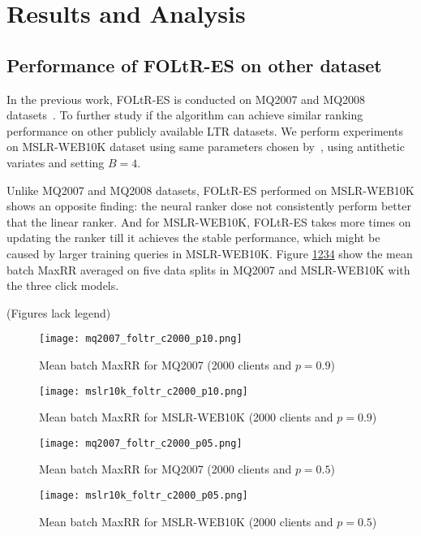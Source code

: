 \section{Results and Analysis}



\subsection{Performance of FOLtR-ES on other dataset}

In the previous work, FOLtR-ES is conducted on MQ2007 and MQ2008 datasets~\cite{kharitonov2019federated}. To further study if the algorithm can achieve similar ranking performance on other publicly available LTR datasets. We perform experiments on MSLR-WEB10K dataset using same parameters chosen by~\cite{kharitonov2019federated}, using antithetic variates and setting $B = 4$. 

Unlike MQ2007 and MQ2008 datasets, FOLtR-ES performed on MSLR-WEB10K shows an opposite finding: the neural ranker dose not consistently perform better that the linear ranker. And for MSLR-WEB10K, FOLtR-ES takes more times on updating the ranker till it achieves the stable performance, which might be caused by larger training queries in MSLR-WEB10K. Figure \ref{fig: mq2007-rq1-1.0}\ref{fig: mslr-rq1-1.0}\ref{fig: mq2007-rq1-0.5}\ref{fig: mslr-rq1-0.5} show the mean batch MaxRR averaged on five data splits in MQ2007 and MSLR-WEB10K with the three click models.

(Figures lack legend)
\begin{figure}[H]
	\centering
	\texttt{[image: mq2007\_foltr\_c2000\_p10.png]}
	\caption{Mean batch MaxRR for MQ2007 (2000 clients and $p = 0.9$)}
	\label{fig: mq2007-rq1-1.0}
\end{figure}
\begin{figure}[H]
	\centering
	\texttt{[image: mslr10k\_foltr\_c2000\_p10.png]}
	\caption{Mean batch MaxRR for MSLR-WEB10K (2000 clients and $p = 0.9$)}
	\label{fig: mslr-rq1-1.0}
\end{figure}

\begin{figure}[H]
	\centering
	\texttt{[image: mq2007\_foltr\_c2000\_p05.png]}
	\caption{Mean batch MaxRR for MQ2007 (2000 clients and $p = 0.5$)}
	\label{fig: mq2007-rq1-0.5}
\end{figure}
\begin{figure}[H]
	\centering
	\texttt{[image: mslr10k\_foltr\_c2000\_p05.png]}
	\caption{Mean batch MaxRR for MSLR-WEB10K (2000 clients and $p = 0.5$)}
	\label{fig: mslr-rq1-0.5}
\end{figure}


